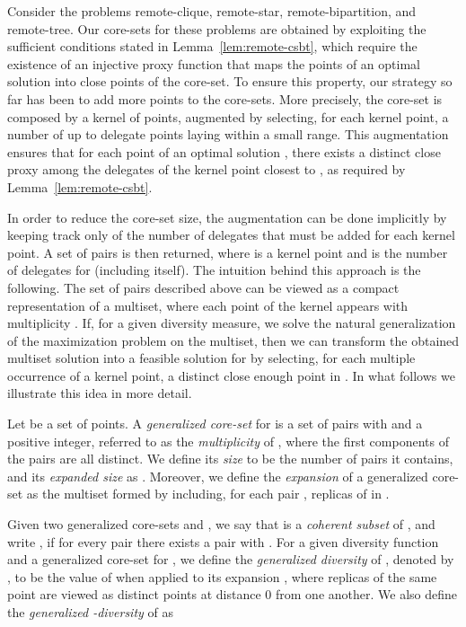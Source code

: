 \documentclass{article}
\begin{document}
Consider the problems remote-clique, remote-star, remote-bipartition,
and remote-tree. Our core-sets for these problems are obtained by
exploiting the sufficient conditions stated in
Lemma~\ref{lem:remote-csbt}, which require the existence of an
injective proxy function that maps the points of an optimal solution
into close points of the core-set.  To ensure this property, our
strategy so far has been to add more points to the core-sets.  More
precisely, the core-set is composed by a kernel of  points,
augmented by selecting, for each kernel point, a number of up to 
delegate points laying within a small range.  This augmentation
ensures that for each point  of an optimal solution , there
exists a distinct close proxy among the delegates of the kernel point
closest to , as required by Lemma~\ref{lem:remote-csbt}.

In order to reduce the core-set size, the augmentation can be done
implicitly by keeping track only of the number of delegates that must
be added for each kernel point. A set of pairs  is then
returned, where  is a kernel point and  is the number of
delegates for  (including  itself).
The intuition behind this approach is the following. The set of pairs
described above can be viewed as a compact representation of a
multiset, where each point  of the kernel appears with multiplicity
. If, for a given diversity measure, we solve the natural
generalization of the maximization problem on the multiset, then we
can transform the obtained multiset solution into a feasible solution
for  by selecting, for each multiple occurrence of a kernel point,
a distinct close enough point in .  In what follows we illustrate
this idea in more detail.

Let  be a set of points. A \emph{generalized core-set}  for 
is a set of pairs  with  and  a positive
integer, referred to as the \emph{multiplicity} of , where the
first components of the pairs are all distinct. We define its
\emph{size}  to be the number of pairs it contains, and its
\emph{expanded size} as .
Moreover, we define the \emph{expansion} of a generalized core-set 
as the multiset  formed by including, for each pair
,  replicas of  in .

Given two generalized core-sets  and , we say that  is
a \emph{coherent subset} of , and write , if
for every pair  there exists a pair
 with . For a given diversity
function  and a generalized core-set  for , we
define the \emph{generalized diversity} of , denoted by
, to be the value of  when applied to its
expansion , where  replicas of the same point 
are viewed as  distinct points at distance 0 from one another.
We also define the \emph{generalized -diversity} of  as
\end{document}
